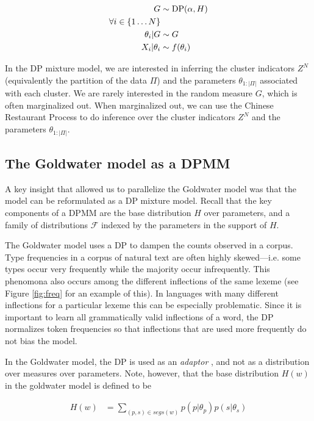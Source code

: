 \begin{align}
  G &\sim \mathrm{DP}(\alpha, H) \\
  \forall i \in \{1 \ldots N\}& \\
  \theta_i|G &\sim G \\
  X_i|\theta_i &\sim f(\theta_i)
\end{align}

In the DP mixture model, we are interested in inferring the cluster
indicators $Z^N$ (equivalently the partition of the data $\Pi$) and
the parameters $\theta_{1:|\Pi|}$ associated with each cluster. We are
rarely interested in the random measure $G$, which is often
marginalized out. When marginalized out, we can use the Chinese
Restaurant Process to do inference over the cluster indicators $Z^N$
and the parameters $\theta_{1:|\Pi|}$.

\subsection{The Goldwater model as a DPMM}

A key insight that allowed us to parallelize the Goldwater model was
that the model can be reformulated as a DP mixture model. Recall that
the key components of a DPMM are the base distribution $H$ over
parameters, and a family of distributions $\mathcal{F}$ indexed by the
parameters in the support of $H$.

The Goldwater model uses a DP to dampen the counts observed in a
corpus. Type frequencies in a corpus of natural text are often highly
skewed---i.e. some types occur very frequently while the majority
occur infrequently. This phenomona also occurs among the different
inflections of the same lexeme (see Figure \ref{fig:freq} for an
example of this). In languages with many different inflections for a
particular lexeme this can be especially problematic. Since it is
important to learn all grammatically valid inflections of a word, the
DP normalizes token frequencies so that inflections that are used more
frequently do not bias the model.

In the Goldwater model, the DP is used as an \textit{adaptor}
\cite{goldwater2011}, and not as a distribution over measures over
parameters. Note, however, that the base distribution $H(w)$ in the
goldwater model is defined to be

\begin{align*}
  H(w) &= \sum_{(p,s) \in segs(w)} p(p | \theta_p) p(s | \theta_s)
\end{align*}

